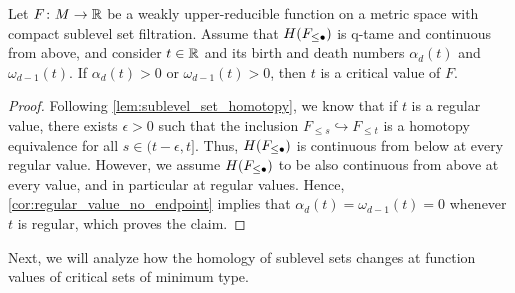 \begin{lem}
\label{lem:endpoint_implies_crit_pt}
	Let $F \colon M \to \mathbb{R}$ be a weakly upper-reducible function on a metric space with compact sublevel set filtration.
	Assume that $H(F_{\leq \bullet})$ is q-tame and continuous from above, and consider $t \in \mathbb{R}$ and its birth and death numbers $\alpha_d(t)$ and $\omega_{d-1}(t)$.
	If $\alpha_d(t) > 0$ or $\omega_{d-1}(t) > 0$, then $t$ is a critical value of $F$.
\end{lem}
\begin{proof}
	Following \cref{lem:sublevel_set_homotopy}, we know that if $t$ is a regular value, there exists $\epsilon > 0$ such that the inclusion $F_{\leq s} \hookrightarrow F_{\leq t}$ is a homotopy equivalence for all $s \in (t - \epsilon, t]$.
	Thus, $H(F_{\leq \bullet})$ is continuous from below at every regular value.
	However, we assume $H(F_{\leq \bullet})$ to be also continuous from above at every value, and in particular at regular values.
	Hence, \cref{cor:regular_value_no_endpoint} implies that $\alpha_d(t) = \omega_{d-1}(t) = 0$ whenever $t$ is regular, which proves the claim.
\end{proof}




Next, we will analyze how the homology of sublevel sets changes at function values of critical sets of minimum type.

